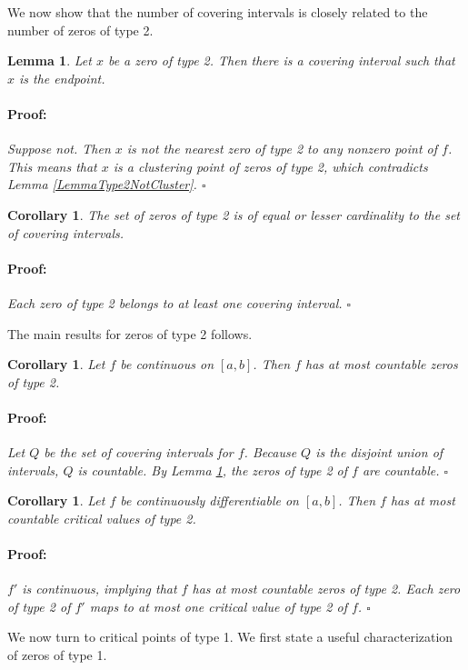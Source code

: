 \documentclass{article}
\newenvironment{proof}{\paragraph{Proof:}}{\hfill$\square$}
\newtheorem{lemma}[theorem]{Lemma}
\newtheorem{corollary}[theorem]{Corollary}
\begin{document}
We now show that the number of covering intervals is closely related to the number of zeros of type 2.

\begin{lemma}
Let $x$ be a zero of type 2. Then there is a covering interval such that $x$ is the endpoint. 
\begin{proof}
Suppose not. Then $x$ is not the nearest zero of type 2 to any nonzero point of $f$. This means that $x$ is a clustering point of zeros of type 2, which contradicts Lemma \ref{LemmaType2NotCluster}.
\end{proof}
\end{lemma}

\begin{corollary}
\label{CorollaryZeroType2Cardinality}
The set of zeros of type 2 is of equal or lesser cardinality to the set of covering intervals.
\begin{proof}
Each zero of type 2 belongs to at least one covering interval.
\end{proof}
\end{corollary}

The main results for zeros of type 2 follows.

\begin{corollary}
Let $f$ be continuous on $[a, b]$. Then $f$ has at most countable zeros of type 2.
\begin{proof}
Let $Q$ be the set of covering intervals for $f$. Because $Q$ is the disjoint union of intervals, $Q$ is countable. By Lemma \ref{CorollaryZeroType2Cardinality}, the zeros of type 2 of $f$ are countable.
\end{proof}
\end{corollary}

\begin{corollary}
Let $f$ be continuously differentiable on $[a, b]$. Then $f$ has at most countable critical values of type 2.
\begin{proof}
$f'$ is continuous, implying that $f$ has at most countable zeros of type 2. Each zero of type 2 of $f'$ maps to at most one critical value of type 2 of $f$.
\end{proof}
\end{corollary}

We now turn to critical points of type 1. We first state a useful characterization of zeros of type 1.
\end{document}
